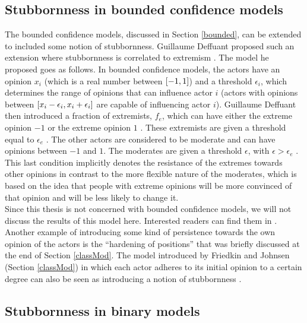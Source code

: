 \documentclass[11 pt , letterpaper , twoside , openright]{book}
\begin{document}
\subsection{Stubbornness in bounded confidence models}

The bounded confidence models, discussed in Section \ref{bounded}, can be extended to included some notion of stubbornness. Guillaume Deffuant proposed such an extension where stubbornness is correlated to extremism \cite{Deffuant2006}. The model he proposed goes as follows. In bounded confidence models, the actors have an opinion $x_i$ (which is a real number between $\interval{-1}{1}$) and a threshold $\epsilon_i$, which determines the range of opinions that can influence actor $i$ (actors with opinions between $\interval{x_i - \epsilon_i}{x_i + \epsilon_i}$ are capable of influencing actor $i$). Guillaume Deffuant then introduced a fraction of extremists, $f_e$, which can have either the extreme opinion $-1$ or the extreme opinion $1$ \cite{Deffuant2006}. These extremists are given a threshold equal to $\epsilon_e$ \cite{Deffuant2006}. The other actors are considered to be moderate and can have opinions between $-1$ and $1$. The moderates are given a threshold $\epsilon$, with $\epsilon > \epsilon_e$ \cite{Deffuant2006}. This last condition implicitly denotes the resistance of the extremes towards other opinions in contrast to the more flexible nature of the moderates, which is based on the idea that people with extreme opinions will be more convinced of that opinion and will be less likely to change it.\\
\newline
Since this thesis is not concerned with bounded confidence models, we will not discuss the results of this model here. Interested readers can find them in \cite{Deffuant2006}. \\
\newline
Another example of introducing some kind of persistence towards the own opinion of the actors is the ``hardening of positions'' that was briefly discussed at the end of Section \ref{classMod}. The model introduced by Friedkin and Johnsen (Section \ref{classMod}) in which each actor adheres to its initial opinion to a certain degree can also be seen as introducing a notion of stubbornness \cite{Noorazar2020}.

\subsection{Stubbornness in binary models}
\label{stubbBin}
\end{document}
